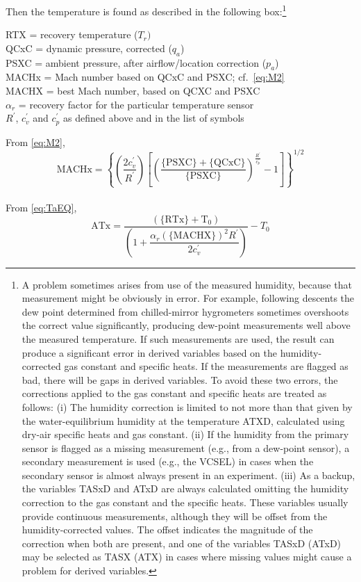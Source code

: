 \documentclass[
  english,
]{book}
\begin{document}
Then the temperature is found as described in the following box:\footnote{A problem sometimes arises from use of the measured humidity, because that measurement might be obviously in error. For example, following descents the dew point determined from chilled-mirror hygrometers sometimes overshoots the correct value significantly, producing dew-point measurements well above the measured temperature. If such measurements are used, the result can produce a significant error in derived variables based on the humidity-corrected gas constant and specific heats. If the measurements are flagged as bad, there will be gaps in derived variables. To avoid these two errors, the corrections applied to the gas constant and specific heats are treated as follows: (i) The humidity correction is limited to not more than that given by the water-equilibrium humidity at the temperature ATXD, calculated using dry-air specific heats and gas constant. (ii) If the humidity from the primary sensor is flagged as a missing measurement (e.g., from a dew-point sensor), a secondary measurement is used (e.g., the VCSEL) in cases when the secondary sensor is almost always present in an experiment. (iii) As a backup, the variables TASxD and ATxD are always calculated omitting the humidity correction to the gas constant and the specific heats. These variables usually provide continuous measurements, although they will be offset from the humidity-corrected values. The offset indicates the magnitude of the correction when both are present, and one of the variables TASxD (ATxD) may be selected as TASX (ATX) in cases where missing values might cause a problem for derived variables.}

RTX = recovery temperature (\(T_{r})\)\\
QCxC = dynamic pressure, corrected (\(q_{a}\))\\
PSXC = ambient pressure, after airflow/location correction
(\(p_{a}\))\\
MACHx = Mach number
based on QCxC and PSXC; cf.~\eqref{eq:M2}\\
MACHX = best Mach number, based on QCXC and PSXC\\
\(\alpha_{r}\) = recovery factor for the particular temperature sensor\\
\(R^{\prime}\), \(c_{v}^{\prime}\) and \(c_{p}^{\prime}\) as defined
above and in the list of symbols

From \eqref{eq:M2},
\begin{equation}
\mathrm{MACHx}=\left\{ \left(\frac{2c_{v}^{\prime}}{R^{\prime}}\right)\left[\left(\frac{\mathrm{\{PSXC\}+\{QCxC\}}}{\mathrm{\{PSXC\}}}\right)^{\frac{R^{\prime}}{c_{p}^{\prime}}}-1\right]\right\} ^{1/2}  
\label{eq:MachBox}
\end{equation}\\
From \eqref{eq:TaEQ},
\begin{equation}
\mathrm{ATx}=\frac{\mathrm{\left(\{RTx\}+T_{0}\right)}}{\left(1+\dfrac{\alpha_{r}\mathrm{(\{MACHX\})}^{2}R^{\prime}}{2c_{v}^{\prime}}\right)}-T_{0}
\label{eq:ATbox}
\end{equation}
\end{document}
